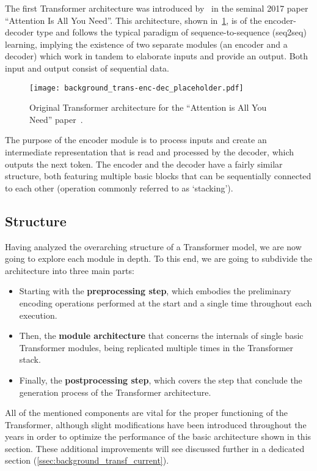 The first Transformer architecture was introduced by~\citet{vaswani2017} in the seminal 2017 paper ``Attention Is All You Need''.
This architecture, shown in~\cref{fig:background_trans-enc-dec}, is of the encoder-decoder type and follows the typical paradigm of sequence-to-sequence (seq2seq) learning, implying the existence of two separate modules (an encoder and a decoder) which work in tandem to elaborate inputs and provide an output.
Both input and output consist of sequential data.

\begin{figure}[t!]
    \centering
    \texttt{[image: background\_trans-enc-dec\_placeholder.pdf]}
    \caption{Original Transformer architecture for the ``Attention is All You Need'' paper~\cite{vaswani2017}.}
    \label{fig:background_trans-enc-dec}
\end{figure}

The purpose of the encoder module is to process inputs and create an intermediate representation that is read and processed by the decoder, which outputs the next token.
The encoder and the decoder have a fairly similar structure, both featuring multiple basic blocks that can be sequentially connected to each other (operation commonly referred to as `stacking').

\subsection{Structure}\label{ssec:background_transf_structure}

Having analyzed the overarching structure of a Transformer model, we are now going to explore each module in depth.
To this end, we are going to subdivide the architecture into three main parts:
\begin{itemize}
    \item Starting with the \textbf{preprocessing step}, which embodies the preliminary encoding operations performed at the start and a single time throughout each execution.
    \item Then, the \textbf{module architecture} that concerns the internals of single basic Transformer modules, being replicated multiple times in the Transformer stack.
    \item Finally, the \textbf{postprocessing step}, which covers the step that conclude the generation process of the Transformer architecture.
\end{itemize}

All of the mentioned components are vital for the proper functioning of the Transformer, although slight modifications have been introduced throughout the years in order to optimize the performance of the basic architecture shown in this section.
These additional improvements will see discussed further in a dedicated section (\cref{ssec:background_transf_current}).

